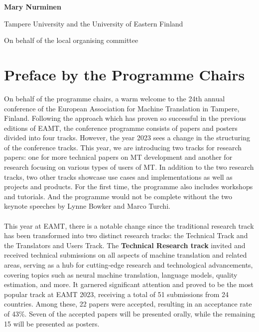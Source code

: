 \documentclass[a4paper,11pt,twoside]{book}
\begin{document}
\begin{onehalfspacing}
\noindent \textbf{Mary Nurminen}

\noindent Tampere University and the University of Eastern Finland

\noindent On behalf of the local organising committee\\

\chapter*{Preface by the Programme Chairs}

\noindent
On behalf of the programme chairs, a warm welcome to the 24th annual conference of the European Association for Machine Translation in Tampere, Finland. Following the approach which has proven so successful in the previous editions of EAMT, the conference programme consists of papers and posters divided into four tracks. However, the year 2023 sees a change in the structuring of the conference tracks. This year, we are introducing two tracks for research papers: one for more technical papers on MT development and another for research focusing on various types of users of MT. In addition to the two research tracks, two other tracks showcase use cases and implementations as well as projects and products. For the first time, the programme also includes workshops and tutorials. And the programme would not be complete without the two keynote speeches by Lynne Bowker and Marco Turchi.\\
\\
\noindent
This year at EAMT, there is a notable change since the traditional research track has been transformed into two distinct research tracks: the Technical Track and the Translators and Users Track. The \textbf{Technical Research track} invited and received technical submissions on all aspects of machine translation and related areas, serving as a hub for cutting-edge research and technological advancements, covering topics such as neural machine translation, language models, quality estimation, and more. It garnered significant attention and proved to be the most popular track at EAMT 2023, receiving a total of 51 submissions from 24 countries. Among these, 22 papers were accepted, resulting in an acceptance rate of 43\%. Seven of the accepted papers will be presented orally, while the remaining 15 will be presented as posters.\\
\\
\noindent

\end{onehalfspacing}
\end{document}
